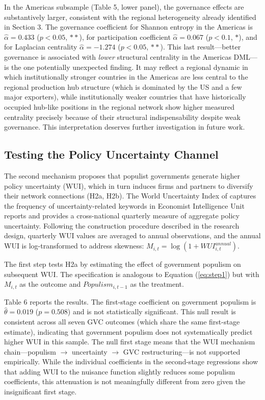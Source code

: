 \documentclass[12pt]{article}
\begin{document}
In the Americas subsample (Table 5, lower panel), the governance effects are substantively larger, consistent with the regional heterogeneity already identified in Section 3. The governance coefficient for Shannon entropy in the Americas is $\hat{\alpha} = 0.433$ ($p < 0.05$, $**$), for participation coefficient $\hat{\alpha} = 0.067$ ($p < 0.1$, $*$), and for Laplacian centrality $\hat{\alpha} = -1.274$ ($p < 0.05$, $**$). This last result---better governance is associated with \textit{lower} structural centrality in the Americas DML---is the one potentially unexpected finding. It may reflect a regional dynamic in which institutionally stronger countries in the Americas are less central to the regional production hub structure (which is dominated by the US and a few major exporters), while institutionally weaker countries that have historically occupied hub-like positions in the regional network show higher measured centrality precisely because of their structural indispensability despite weak governance. This interpretation deserves further investigation in future work.



\subsection{Testing the Policy Uncertainty Channel}

The second mechanism proposes that populist governments generate higher policy uncertainty (WUI), which in turn induces firms and partners to diversify their network connections (H2a, H2b). The World Uncertainty Index of \citet{ahir2022} captures the frequency of uncertainty-related keywords in Economist Intelligence Unit reports and provides a cross-national quarterly measure of aggregate policy uncertainty. Following the construction procedure described in the research design, quarterly WUI values are averaged to annual observations, and the annual WUI is log-transformed to address skewness: $M_{i,t} = \log(1 + WUI^{annual}_{i,t})$.

The first step tests H2a by estimating the effect of government populism on subsequent WUI. The specification is analogous to Equation (\ref{eq:step1}) but with $M_{i,t}$ as the outcome and $Populism_{i,t-1}$ as the treatment.

Table 6 reports the results. The first-stage coefficient on government populism is $\hat{\theta} = 0.019$ ($p = 0.508$) and is not statistically significant. This null result is consistent across all seven GVC outcomes (which share the same first-stage estimate), indicating that government populism does not systematically predict higher WUI in this sample. The null first stage means that the WUI mechanism chain---populism $\to$ uncertainty $\to$ GVC restructuring---is not supported empirically. While the individual coefficients in the second-stage regressions show that adding WUI to the nuisance function slightly reduces some populism coefficients, this attenuation is not meaningfully different from zero given the insignificant first stage.
\end{document}
